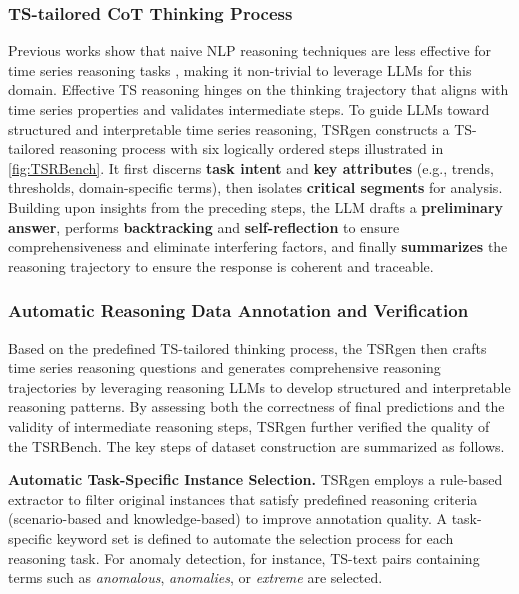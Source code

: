 \documentclass{article}
\theoremstyle{plain}
\theoremstyle{definition}
\theoremstyle{remark}
\begin{document}
\subsubsection{TS-tailored CoT Thinking Process}
\label{subsubsec:CoTprocess}
Previous works show that naive NLP reasoning techniques are less effective for time series reasoning tasks \cite{liu2025system12, merrill2024language}, making it non-trivial to leverage LLMs for this domain. Effective TS reasoning hinges on the thinking trajectory that aligns with time series properties and validates intermediate steps. To guide LLMs toward structured and interpretable time series reasoning, TSRgen constructs a TS-tailored reasoning process with six logically ordered steps illustrated in \autoref{fig:TSRBench}. It first discerns \textbf{task intent} and \textbf{key attributes} (e.g., trends, thresholds, domain-specific terms), then isolates \textbf{critical segments} for analysis. Building upon insights from the preceding steps, the LLM drafts a \textbf{preliminary answer}, performs \textbf{backtracking} and \textbf{self-reflection} \cite{ji2023selfreflection, tyen2024backtrack} to ensure comprehensiveness and eliminate interfering factors, and finally \textbf{summarizes} the reasoning trajectory to ensure the response is coherent and traceable. 

\subsubsection{Automatic Reasoning Data Annotation and Verification} 


Based on the predefined TS-tailored thinking process, the TSRgen then crafts time series reasoning questions and generates comprehensive reasoning trajectories by leveraging reasoning LLMs to develop structured and interpretable reasoning patterns. By assessing both the correctness of final predictions and the validity of intermediate reasoning steps, TSRgen further verified the quality of the TSRBench. The key steps of dataset construction are summarized as follows.

\textbf{Automatic Task-Specific Instance Selection.} TSRgen employs a rule-based extractor to filter original instances that satisfy predefined reasoning criteria (scenario-based and knowledge-based) to improve annotation quality. A task-specific keyword set is defined to automate the selection process for each reasoning task. For anomaly detection, for instance, 
TS-text pairs containing terms such as \textit{anomalous}, \textit{anomalies}, or \textit{extreme} are selected.
\vspace{-0.5em}
\end{document}
